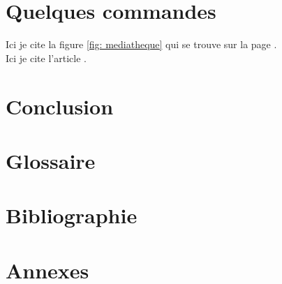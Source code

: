 \documentclass{rapportECM}
\begin{document}
\section{Quelques commandes}


Ici je cite la figure \ref{fig: mediatheque} qui se trouve sur la page \pageref{fig: mediatheque}.\\

Ici je cite l'article \cite{Debauche2021}.

\section*{Conclusion}
\lipsum[1-2]

\newpage
\pagestyle{glossaire}
\section*{Glossaire}

\pagebreak

\newpage
\pagestyle{biblio}
\section*{Bibliographie}
\printbibliography[ heading = none]
\pagebreak

\section*{Annexes}
\pagestyle{annexes}
\initannexes

\end{document}
